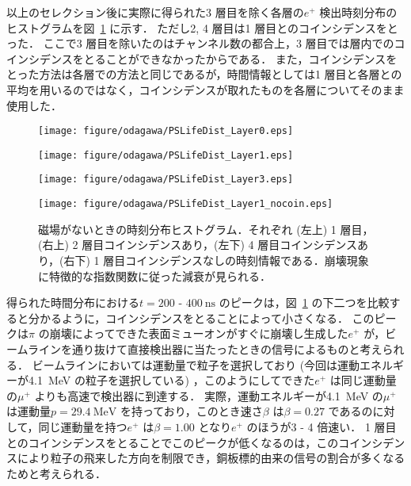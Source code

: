 以上のセレクション後に実際に得られた3 層目を除く各層の$e^{+}$ 検出時刻分布のヒストグラムを図~\ref{fig:PSLifeDist} に示す．
ただし2, 4 層目は1 層目とのコインシデンスをとった．
ここで3 層目を除いたのはチャンネル数の都合上，3 層目では層内でのコインシデンスをとることができなかったからである．
また，コインシデンスをとった方法は各層での方法と同じであるが，時間情報としては1 層目と各層との平均を用いるのではなく，コインシデンスが取れたものを各層についてそのまま使用した．
\begin{figure}[h]
	\centering
	\begin{minipage}{0.45\textwidth}
	\centering
	\texttt{[image: figure/odagawa/PSLifeDist\_Layer0.eps]}
	\end{minipage}
	\begin{minipage}{0.45\textwidth}
	\centering
	\texttt{[image: figure/odagawa/PSLifeDist\_Layer1.eps]}
	\end{minipage}
	\begin{minipage}{0.45\textwidth}
	\centering
	\texttt{[image: figure/odagawa/PSLifeDist\_Layer3.eps]}
	\end{minipage}
	\begin{minipage}{0.45\textwidth}
	\centering
	\texttt{[image: figure/odagawa/PSLifeDist\_Layer1\_nocoin.eps]}
	\end{minipage}
	\caption{磁場がないときの時刻分布ヒストグラム．それぞれ (左上) 1 層目，(右上) 2 層目コインシデンスあり，(左下) 4 層目コインシデンスあり，(右下) 1 層目コインシデンスなしの時刻情報である．崩壊現象に特徴的な指数関数に従った減衰が見られる．}
	\label{fig:PSLifeDist}
\end{figure}%

得られた時間分布における$t = 200$ - $400~\mathrm{ns}$ のピークは，図~\ref{fig:PSLifeDist} の下二つを比較すると分かるように，コインシデンスをとることによって小さくなる．
このピークは$\pi$ の崩壊によってできた表面ミューオンがすぐに崩壊し生成した$e^{+}$ が，ビームラインを通り抜けて直接検出器に当たったときの信号によるものと考えられる．
ビームラインにおいては運動量で粒子を選択しており (今回は運動エネルギーが4.1~MeV の粒子を選択している) ，このようにしてできた$e^{+}$ は同じ運動量の$\mu^{+}$ よりも高速で検出器に到達する．
実際，運動エネルギーが4.1~MeV の$\mu^{+}$ は運動量$p = 29.4~\mathrm{MeV}$ を持っており，このとき速さ$\beta$ は$\beta = 0.27$ であるのに対して，同じ運動量を持つ$e^{+}$ は$\beta = 1.00$ となり$e^{+}$ のほうが3 - 4 倍速い．
1 層目とのコインシデンスをとることでこのピークが低くなるのは，このコインシデンスにより粒子の飛来した方向を制限でき，銅板標的由来の信号の割合が多くなるためと考えられる．


